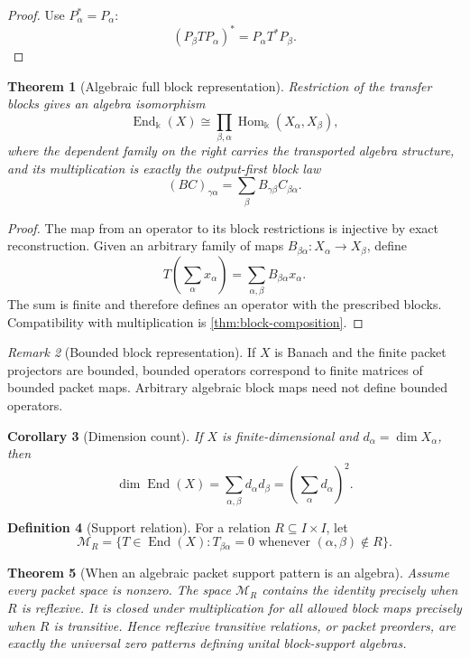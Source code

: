 \documentclass[11pt]{article}
\newtheorem{theorem}{Theorem}[section]
\newtheorem{corollary}[theorem]{Corollary}
\theoremstyle{definition}
\newtheorem{definition}[theorem]{Definition}
\theoremstyle{remark}
\newtheorem{remark}[theorem]{Remark}
\newcommand{\End}{\operatorname{End}}
\newcommand{\Hom}{\operatorname{Hom}}
\newcommand{\bbk}{\mathbb{k}}
\begin{document}
\begin{proof}
Use $P_{\alpha}^*=P_{\alpha}$:
\[
(P_{\beta}TP_{\alpha})^*=P_{\alpha}T^*P_{\beta}.
\]
\end{proof}

\begin{theorem}[Algebraic full block representation]
\label{thm:block-algebra}
Restriction of the transfer blocks gives an algebra isomorphism
\[
{
\End_{\bbk}(X)
\cong
\prod_{\beta,\alpha}\Hom_{\bbk}(X_{\alpha},X_{\beta}),
}
\]
where the dependent family on the right carries the transported algebra structure, and its multiplication is exactly the output-first block law
\[
(BC)_{\gamma\alpha}=\sum_{\beta}B_{\gamma\beta}C_{\beta\alpha}.
\]
\end{theorem}

\begin{proof}
The map from an operator to its block restrictions is injective by exact reconstruction. Given an arbitrary family of maps $B_{\beta\alpha}:X_{\alpha}\to X_{\beta}$, define
\[
T\left(\sum_{\alpha}x_{\alpha}\right)
=
\sum_{\alpha,\beta}B_{\beta\alpha}x_{\alpha}.
\]
The sum is finite and therefore defines an operator with the prescribed blocks. Compatibility with multiplication is \cref{thm:block-composition}.
\end{proof}

\begin{remark}[Bounded block representation]
If $X$ is Banach and the finite packet projectors are bounded, bounded operators correspond to finite matrices of bounded packet maps. Arbitrary algebraic block maps need not define bounded operators.
\end{remark}

\begin{corollary}[Dimension count]
\label{cor:block-dimension-count}
If $X$ is finite-dimensional and $d_{\alpha}=\dim X_{\alpha}$, then
\[
\dim\End(X)
=
\sum_{\alpha,\beta}d_{\alpha}d_{\beta}
=
\left(\sum_{\alpha}d_{\alpha}\right)^2.
\]
\end{corollary}

\begin{definition}[Support relation]
For a relation $R\subseteq I\times I$, let
\[
\mathcal M_R
=
\{T\in\End(X):T_{\beta\alpha}=0
\text{ whenever }(\alpha,\beta)\notin R\}.
\]
\end{definition}

\begin{theorem}[When an algebraic packet support pattern is an algebra]
\label{thm:block-support-algebra}
Assume every packet space is nonzero. The space $\mathcal M_R$ contains the identity precisely when $R$ is reflexive. It is closed under multiplication for all allowed block maps precisely when $R$ is transitive. Hence reflexive transitive relations, or packet preorders, are exactly the universal zero patterns defining unital block-support algebras.
\end{theorem}
\end{document}
